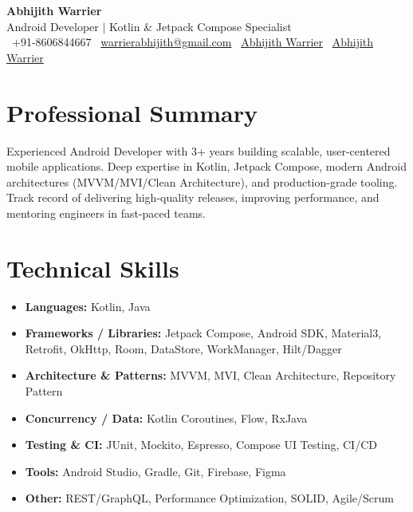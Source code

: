 \documentclass[a4paper,11pt]{article}
\begin{document}
\begin{center}
    {\LARGE\bfseries\color{darkgray} Abhijith Warrier} \\[4pt]
    {\small Android Developer \quad $|$ \quad Kotlin \& Jetpack Compose Specialist} \\[6pt]
    \small
    \faPhone\ +91-8606844667 \quad
    \faEnvelope\ \href{mailto:warrierabhijith@gmail.com}{warrierabhijith@gmail.com} \quad
    \faLinkedin\ \href{https://www.linkedin.com/in/abhijith-warrier/}{Abhijith Warrier} \quad
    \faGithub\ \href{https://github.com/abhijithwrrr}{Abhijith Warrier}
\end{center}

\vspace{4pt}

\section{Professional Summary}
Experienced Android Developer with 3+ years building scalable, user-centered mobile applications. Deep expertise in Kotlin, Jetpack Compose, modern Android architectures (MVVM/MVI/Clean Architecture), and production-grade tooling. Track record of delivering high-quality releases, improving performance, and mentoring engineers in fast-paced teams.

\section{Technical Skills}
\begin{itemize}[leftmargin=0.12in, label={}]
    \item \textbf{Languages:} Kotlin, Java
    \item \textbf{Frameworks / Libraries:} Jetpack Compose, Android SDK, Material3, Retrofit, OkHttp, Room, DataStore, WorkManager, Hilt/Dagger
    \item \textbf{Architecture \& Patterns:} MVVM, MVI, Clean Architecture, Repository Pattern
    \item \textbf{Concurrency / Data:} Kotlin Coroutines, Flow, RxJava
    \item \textbf{Testing \& CI:} JUnit, Mockito, Espresso, Compose UI Testing, CI/CD
    \item \textbf{Tools:} Android Studio, Gradle, Git, Firebase, Figma
    \item \textbf{Other:} REST/GraphQL, Performance Optimization, SOLID, Agile/Scrum
\end{itemize}
\end{document}
